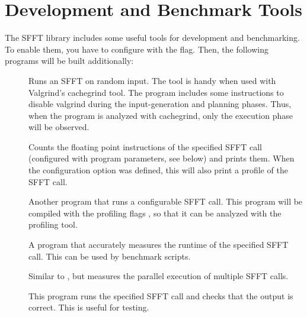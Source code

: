 \documentclass[letterpaper,10pt,english]{sphinxmanual}
\begin{document}
\section{Development and Benchmark Tools}
\label{development:development-and-benchmark-tools}
The SFFT library includes some useful tools for development and benchmarking.
To enable them, you have to configure with the  flag. Then, the
following programs will be built additionally:
\begin{description}
\item[{}] \leavevmode
Runs an SFFT on random input. The tool is handy when used with Valgrind's
cachegrind tool. The program includes some instructions to disable
valgrind during the input-generation and planning phases. Thus, when the
program is analyzed with cachegrind, only the execution phase will be
observed.

\item[{}] \leavevmode
Counts the floating point instructions of the specified SFFT call
(configured with program parameters, see below) and prints them. When the
configuration option  was defined, this will also print a
profile of the SFFT call.

\item[{}] \leavevmode
Another program that runs a configurable SFFT call. This program will be
compiled with the profiling flags , so that it can be analyzed with
the  profiling tool.

\item[{}] \leavevmode
A program that accurately measures the runtime of the specified SFFT call.
This can be used by benchmark scripts.

\item[{}] \leavevmode
Similar to , but measures the parallel execution of
multiple SFFT calls.

\item[{}] \leavevmode
This program runs the specified SFFT call and checks that the output is
correct. This is useful for testing.

\end{description}
\end{document}
